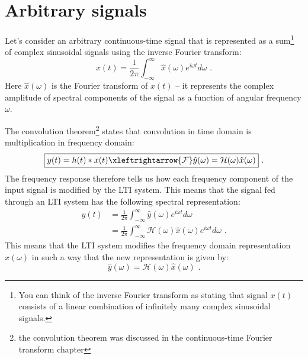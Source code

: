 


\section{Arbitrary signals}

Let's consider an arbitrary continuous-time signal that is represented
as a sum\footnote{You can think of the inverse Fourier transform as stating
that signal $x(t)$ consists of a linear combination of infinitely many
complex sinusoidal signals.} of complex sinusoidal signals using the inverse Fourier transform:
\begin{equation}
x(t)  = \frac{1}{2\pi} \int_{-\infty}^{\infty} \hat{x}(\omega) e^{i \omega t} d\omega \,\,.
\end{equation}
Here $\hat{x}(\omega)$ is the Fourier transform of $x(t)$ -- it
represents the complex amplitude of spectral components of the signal
as a function of angular frequency $\omega$.

The convolution theorem\footnote{the convolution theorem was discussed
in the continuous-time Fourier transform chapter} states that
convolution in time domain is multiplication in frequency domain:
\begin{equation}
\boxed{
y(t) = h(t)*x(t) \xleftrightarrow{\mathcal{F}} \hat{y}(\omega)=\mathcal{H}(\omega)\hat{x}(\omega)
} \,\,.
\end{equation}
The frequency response therefore tells us how each frequency component
of the input signal is modified by the LTI system.
This means that the signal fed through an LTI system has the following spectral representation:
\begin{align}
y(t)  &= \frac{1}{2\pi} \int_{-\infty}^{\infty} \hat{y}(\omega) e^{i \omega t} d\omega\\
      &= \frac{1}{2\pi} \int_{-\infty}^{\infty} \mathcal{H}(\omega)\hat{x}(\omega) e^{i \omega t} d\omega \,\,.
\end{align}
This means that the LTI system modifies the frequency domain representation
$\hat{x}(\omega)$ in such a way that the new representation is given by:
\begin{equation}
\boxed{
\hat{y}(\omega) = \mathcal{H}(\omega)\hat{x}(\omega)
} \,\,.
\end{equation}
\fi


